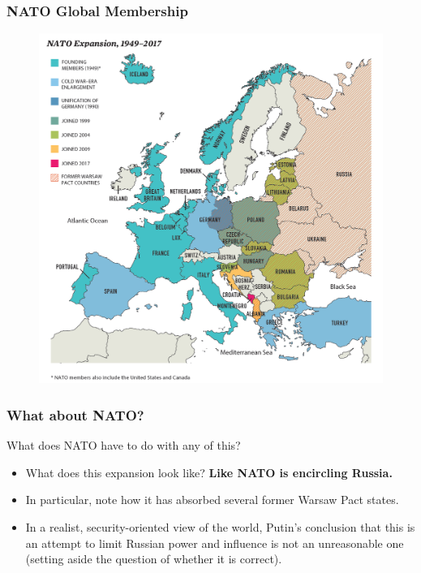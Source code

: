\documentclass{beamer}
\begin{document}
\begin{frame} 
	\frametitle{\LARGE{NATO Global Membership}}
	\begin{figure}[ht!]
		\centering
		\includegraphics[width=\textwidth,height=\textheight, keepaspectratio]{nato.png}
	\end{figure}
\end{frame}

\begin{frame} 
	\frametitle{\LARGE{What about NATO?}}
	What does NATO have to do with any of this?
	\begin{itemize}
		\item What does this expansion look like? \pause \textbf{Like NATO is encircling Russia.} \pause
		\item In particular, note how it has absorbed several former Warsaw Pact states. \pause
		\item In a realist, security-oriented view of the world, Putin's conclusion that this is an attempt to limit Russian power and influence is not an unreasonable one (setting aside the question of whether it is correct).
	\end{itemize}
\end{frame}
\end{document}
